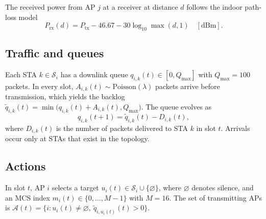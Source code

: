 \documentclass{ieeeaccess}
\begin{document}
The received power from AP $j$ at a receiver at distance $d$ follows the indoor path-loss model
\begin{equation}
P_{\text{rx}}(d) = P_{\text{tx}} - 46.67 - 30 \log_{10} \max(d, 1) \quad [\text{dBm}].
\label{eq:pathloss}
\end{equation}

\subsection{Traffic and queues}
Each STA $k \in \mathcal{S}_i$ has a downlink queue $q_{i,k}(t) \in [0, Q_{\max}]$ with $Q_{\max} = 100$ packets. In every slot, $A_{i,k}(t) \sim \text{Poisson}(\lambda)$ packets arrive before transmission, which yields the backlog $\tilde{q}_{i,k}(t) = \min\bigl(q_{i,k}(t) + A_{i,k}(t), Q_{\max}\bigr)$. The queue evolves as
\begin{equation}
q_{i,k}(t+1) = \tilde{q}_{i,k}(t) - D_{i,k}(t),
\label{eq:queue}
\end{equation}
where $D_{i,k}(t)$ is the number of packets delivered to STA $k$ in slot $t$. Arrivals occur only at STAs that exist in the topology.

\subsection{Actions}
In slot $t$, AP $i$ selects a target $u_i(t) \in \mathcal{S}_i \cup \{\varnothing\}$, where $\varnothing$ denotes silence, and an MCS index $m_i(t) \in \{0,\dots,M-1\}$ with $M = 16$. The set of transmitting APs is $\mathcal{A}(t) = \{ i : u_i(t) \ne \varnothing,\ \tilde{q}_{i,u_i(t)}(t) > 0 \}$.
\end{document}
